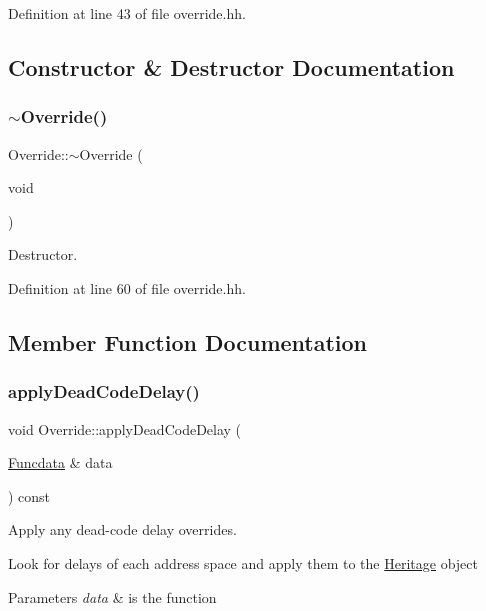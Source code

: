 Definition at line 43 of file override.\+hh.



\subsection{Constructor \& Destructor Documentation}
\mbox{\label{class_override_a0adca3a723f1dec1e81b955f56790a35}} 
\subsubsection{\texorpdfstring{$\sim$Override()}{~Override()}}
{\footnotesize\ttfamily Override\+::$\sim$\+Override (\begin{DoxyParamCaption}\item[{void}]{ }\end{DoxyParamCaption})\hspace{0.3cm}{\ttfamily [inline]}}



Destructor. 



Definition at line 60 of file override.\+hh.



\subsection{Member Function Documentation}
\mbox{\label{class_override_ae1c4b43226ff096764f6d98f325ae759}} 
\subsubsection{\texorpdfstring{applyDeadCodeDelay()}{applyDeadCodeDelay()}}
{\footnotesize\ttfamily void Override\+::apply\+Dead\+Code\+Delay (\begin{DoxyParamCaption}\item[{\mbox{\hyperlink{class_funcdata}{Funcdata}} \&}]{data }\end{DoxyParamCaption}) const}



Apply any dead-\/code delay overrides. 

Look for delays of each address space and apply them to the \mbox{\hyperlink{class_heritage}{Heritage}} object 
\begin{DoxyParams}{Parameters}
{\em data} & is the function \\
\hline
\end{DoxyParams}


